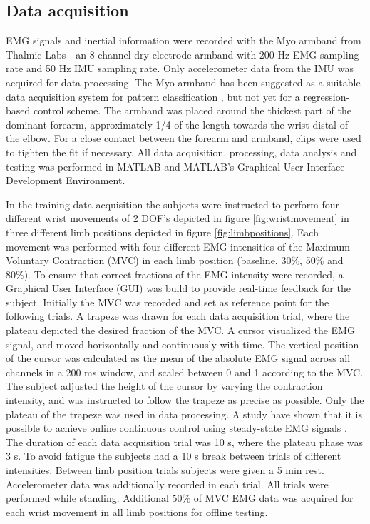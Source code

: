 \documentclass[a4paper, 10pt, conference]{ieeeconf}      %
\begin{document}
\subsection{Data acquisition}
EMG signals and inertial information were recorded with the Myo armband from Thalmic Labs - an 8 channel dry electrode armband with 200 Hz EMG sampling rate and 50 Hz IMU sampling rate. Only accelerometer data from the IMU was acquired for data processing. The Myo armband has been suggested as a suitable data acquisition system for pattern classification \cite{Mendez2017}, but not yet for a regression-based control scheme. 
The armband was placed around the thickest part of the dominant forearm, approximately 1/4 of the length towards the wrist distal of the elbow. For a close contact between the forearm and armband, clips were used to tighten the fit if necessary. All data acquisition, processing, data analysis and testing was performed in MATLAB and MATLAB's Graphical User Interface Development Environment.

In the training data acquisition the subjects were instructed to perform four different wrist movements of 2 DOF's depicted in figure \ref{fig:wristmovement} in three different limb positions depicted in figure \ref{fig:limbpositions}. Each movement was performed with four different EMG intensities of the Maximum Voluntary Contraction (MVC) in each limb position (baseline, 30\%, 50\% and 80\%). To ensure that correct fractions of the EMG intensity were recorded, a Graphical User Interface (GUI) was build to provide real-time feedback for the subject. Initially the MVC was recorded and set as reference point for the following trials. A trapeze was drawn for each data acquisition trial, where the plateau depicted the desired fraction of the MVC. A cursor visualized the EMG signal, and moved horizontally and continuously with time. The vertical position of the cursor was calculated as the mean of the absolute EMG signal across all channels in a 200 ms window, and scaled between 0 and 1 according to the MVC. The subject adjusted the height of the cursor by varying the contraction intensity, and was instructed to follow the trapeze as precise as possible. Only the plateau of the trapeze was used in data processing. A study have shown that it is possible to achieve online continuous control using steady-state EMG signals \cite{mobarak2014}. The duration of each data acquisition trial was 10 s, where the plateau phase was 3 s. To avoid fatigue the subjects had a 10 s break between trials of different intensities. Between limb position trials subjects were given a 5 min rest. Accelerometer data was additionally recorded in each trial. All trials were performed while standing.
Additional 50\% of MVC EMG data was acquired for each wrist movement in all limb positions for offline testing.
\end{document}
